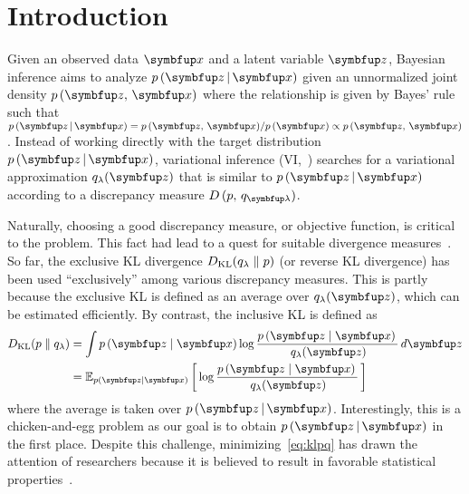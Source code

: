 
\section{Introduction}
Given an observed data \(\vx\) and a latent variable \(\vz\), Bayesian inference aims to analyze \(p\,(\vz\,|\,\vx)\) given an unnormalized joint density \(p\,(\vz,\,\vx)\) where the relationship is given by Bayes' rule such that \(p\,(\vz\,|\,\vx) = {p\,(\vz,\,\vx)}/{p\,(\vx)} \propto p\,(\vz,\,\vx)\).
Instead of working directly with the target distribution \(p\,(\vz\,|\,\vx)\), variational inference (VI,~\citealt{jordan_introduction_1999, blei_variational_2017, zhang_advances_2019}) searches for a variational approximation \(q_{\lambda}(\vz)\) that is similar to \(p\,(\vz\,|\,\vx)\) according to a discrepancy measure \(D\,(p,\, q_{\vlambda})\).

Naturally, choosing a good discrepancy measure, or objective function, is critical to the problem.
This fact had lead to a quest for suitable divergence measures~\citep{pmlr-v37-salimans15, NIPS2016_7750ca35, NIPS2017_35464c84, NEURIPS2018_1cd138d0, pmlr-v97-ruiz19a}.
So far, the exclusive KL divergence \(D_{\mathrm{KL}}(q_{\lambda}\parallel p)\) (or reverse KL divergence) has been used ``exclusively'' among various discrepancy measures.
This is partly because the exclusive KL is defined as an average over \(q_{\lambda}(\vz)\), which can be estimated efficiently.
By contrast, the inclusive KL is defined as
%
\begin{align}
  \DKL{p}{q_{\lambda}}
  &= \int p\,(\vz\mid\vx) \log \frac{p\,(\vz\mid\vx)\,}{\,q_{\lambda}(\vz)} \,d\vz \\
  &= \Esub{p(\vz\mid\vx)}{\log \frac{p\,(\vz\mid\vx)\,}{\,q_{\lambda}(\vz)} } \label{eq:klpq}
\end{align}
%
\noindent where the average is taken over \(p\,(\vz\,|\,\vx)\). 
Interestingly, this is a chicken-and-egg problem as our goal is to obtain \(p\,(\vz\,|\,\vx)\) in the first place.
Despite this challenge, minimizing~\eqref{eq:klpq} has drawn the attention of researchers because it is believed to result in favorable statistical properties~\citep{minka2005divergence, mackay_local_2001}.

